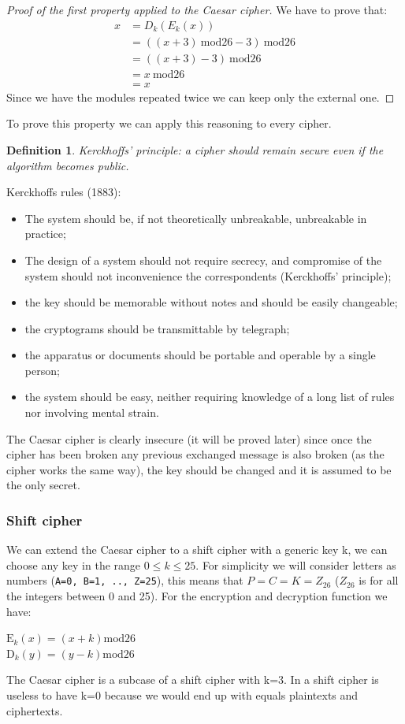 \documentclass[a4paper, 12pt]{report}
\newtheorem{definition}{\textbf{Definition}}
\begin{document}
\begin{proof}[Proof of the first property applied to the Caesar cipher]
	We have to prove that:
	\begin{align}
	x &= D_k(E_k(x)) \\
	&=((x+3) \ \textrm{mod}26 - 3) \ \textrm{mod}26 \\
	&=((x+3) - 3) \ \textrm{mod}26 \\
	&=x \ \textrm{mod}26 \\
	&=x
	\end{align}
	Since we have the modules repeated twice we can keep only the external one.
\end{proof}
To prove this property we can apply this reasoning to every cipher.\\

\begin{definition}
	Kerckhoffs' principle: a cipher should remain secure even if the algorithm becomes public.
\end{definition}

Kerckhoffs rules (1883):
\begin{itemize}
	\item The system should be, if not theoretically unbreakable, unbreakable in practice;
	\item The design of a system should not require secrecy, and compromise of the system should not inconvenience the correspondents (Kerckhoffs' principle);
	\item the key should be memorable without notes and should be easily changeable;
	\item the cryptograms should be transmittable by telegraph;
	\item the apparatus or documents should be portable and operable by a single person;
	\item the system should be easy, neither requiring knowledge of a long list of rules nor involving mental strain.
\end{itemize}


The Caesar cipher is clearly insecure (it will be proved later) since once the cipher has been broken any previous exchanged message is also broken (as the cipher works the same way), the key should be changed and it is assumed to be the only secret.

\subsubsection{Shift cipher}
We can extend the Caesar cipher to a shift cipher with a generic key k, we can choose any key in the range $0\leq k\leq 25$. For simplicity we will consider letters as numbers (\texttt{A=0, B=1, .., Z=25}), this means that $P=C=K=Z_{26}$ ($Z_{26}$ is for all the integers between 0 and 25). For the encryption and decryption function we have:
\begin{center}
	$\textrm{E}_k(x) = (x+k) \textrm{mod}26$\\
	$\textrm{D}_k(y) = (y-k) \textrm{mod}26$
\end{center}
The Caesar cipher is a subcase of a shift cipher with k=3.
In  a shift cipher is useless to have k=0 because we would end up with equals plaintexts and ciphertexts.
\end{document}
